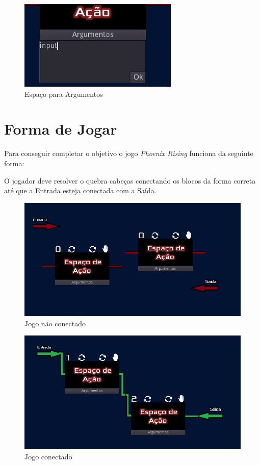 \begin{figure}[H]
    \includegraphics[scale=0.6]{../figuras/argumentos.png}
    \caption{Espaço para Argumentos}
\end{figure}


\section{Forma de Jogar}
\label{sec:consideracoes_preliminares}

Para conseguir completar o objetivo o jogo \textit{Phoenix Rising} funciona
da seguinte forma:

O jogador deve resolver o quebra cabeças conectando os blocos da forma correta
até que a Entrada esteja conectada com a Saída.

\begin{figure}[H]
    \includegraphics[width=\textwidth]{../figuras/jogo_nao_conectado.png}
    \caption{Jogo não conectado}
\end{figure}

\begin{figure}[H]
    \includegraphics[width=\textwidth]{../figuras/jogo_conectado.png}
    \caption{Jogo conectado}
\end{figure}


